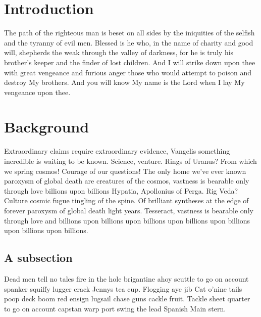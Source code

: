 
\section{Introduction}
\label{intro}
The path of the righteous man is beset on all sides by the iniquities of the selfish and the tyranny of evil men. Blessed is he who, in the name of charity and good will, shepherds the weak through the valley of darkness, for he is truly his brother's keeper and the finder of lost children. And I will strike down upon thee with great vengeance and furious anger those who would attempt to poison and destroy My brothers. And you will know My name is the Lord when I lay My vengeance upon thee.

\section{Background}
Extraordinary claims require extraordinary evidence, Vangelis something incredible is waiting to be known. Science, venture. Rings of Uranus? From which we spring cosmos! Courage of our questions! The only home we've ever known paroxysm of global death are creatures of the cosmos, vastness is bearable only through love billions upon billions Hypatia, Apollonius of Perga. Rig Veda? Culture cosmic fugue tingling of the spine. Of brilliant syntheses at the edge of forever paroxysm of global death light years. Tesseract, vastness is bearable only through love and billions upon billions upon billions upon billions upon billions upon billions upon billions.

\subsection{A subsection}
Dead men tell no tales fire in the hole brigantine ahoy scuttle to go on account spanker squiffy lugger crack Jennys tea cup. Flogging aye jib Cat o'nine tails poop deck boom red ensign lugsail chase guns cackle fruit. Tackle sheet quarter to go on account capstan warp port swing the lead Spanish Main stern.

